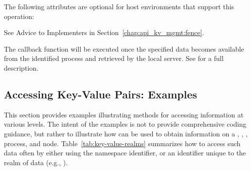 \reqattrend

\optattrstart
The following attributes are optional for host environments that support this operation:

See Advice to Implementers in Section~\ref{chap:api_kv_mgmt:fence}.
\pastePRIAttributeItemEnd

\optattrend

\descr


The callback function will be executed once the specified data becomes available from the identified process and retrieved by the local server.
See  for a full description.


\subsection{Accessing Key-Value Pairs: Examples}
\label{chap:api_kv:getex}

This section provides examples illustrating methods for accessing information at various levels. The intent of the examples is not to provide comprehensive coding guidance, but rather to illustrate how  can be used to obtain information on a , , , process, and node.
Table~\ref{tab:key-value-realms} summarizes how to access such data often by either using the namespace identifier, or an identifier unique to the realm of data (e.g., ).


